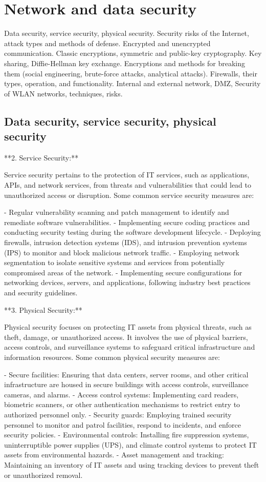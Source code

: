 \documentclass{article}
\begin{document}
\section{Network and data security}

Data security, service security, physical security. Security risks of the Internet, attack types and methods of defense. Encrypted and unencrypted communication. Classic encryptions, symmetric and public-key cryptography. Key sharing, Diffie-Hellman key exchange. Encryptions and methods for breaking them (social engineering, brute-force attacks, analytical attacks). Firewalls, their types, operation, and functionality. Internal and external network, DMZ, Security of WLAN networks, techniques, risks.


\subsection{Data security, service security, physical security}



**2. Service Security:**

Service security pertains to the protection of IT services, such as applications, APIs, and network services, from threats and vulnerabilities that could lead to unauthorized access or disruption. Some common service security measures are:

- Regular vulnerability scanning and patch management to identify and remediate software vulnerabilities.
- Implementing secure coding practices and conducting security testing during the software development lifecycle.
- Deploying firewalls, intrusion detection systems (IDS), and intrusion prevention systems (IPS) to monitor and block malicious network traffic.
- Employing network segmentation to isolate sensitive systems and services from potentially compromised areas of the network.
- Implementing secure configurations for networking devices, servers, and applications, following industry best practices and security guidelines.

**3. Physical Security:**

Physical security focuses on protecting IT assets from physical threats, such as theft, damage, or unauthorized access. It involves the use of physical barriers, access controls, and surveillance systems to safeguard critical infrastructure and information resources. Some common physical security measures are:

- Secure facilities: Ensuring that data centers, server rooms, and other critical infrastructure are housed in secure buildings with access controls, surveillance cameras, and alarms.
- Access control systems: Implementing card readers, biometric scanners, or other authentication mechanisms to restrict entry to authorized personnel only.
- Security guards: Employing trained security personnel to monitor and patrol facilities, respond to incidents, and enforce security policies.
- Environmental controls: Installing fire suppression systems, uninterruptible power supplies (UPS), and climate control systems to protect IT assets from environmental hazards.
- Asset management and tracking: Maintaining an inventory of IT assets and using tracking devices to prevent theft or unauthorized removal.
\end{document}
